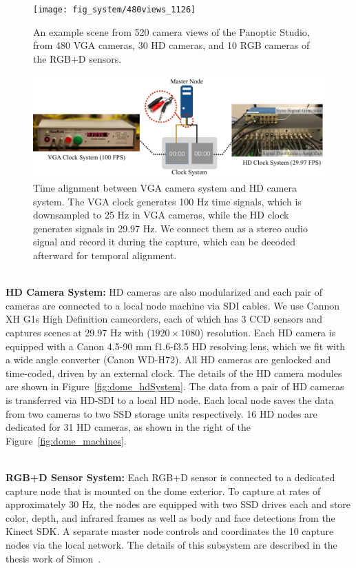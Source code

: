 \begin{figure}
	\centering       
	\texttt{[image: fig\_system/480views\_1126]}
	\caption{An example scene from 520 camera views of the Panoptic Studio, from 480 VGA cameras, 30 HD cameras, and 10 RGB cameras of the RGB+D sensors.}
	\label{fig:dome_exampleScene}
\end{figure}

\begin{figure}
	\centering       
	\includegraphics[trim=0 0 0 0,clip,width=\linewidth]{fig_system/dome_syncSystem}
	\caption{Time alignment between VGA camera system and HD camera system. The VGA clock generates 100 Hz time signals, which is downsampled to 25 Hz in VGA cameras, while the HD clock generates signals in 29.97 Hz. We connect them as a stereo audio signal and record it during the capture, which can be decoded afterward for temporal alignment.}
	\label{fig:dome_syncSystem}
\end{figure}
\mbox{ }\\
\noindent \textbf{HD Camera System:} HD cameras are also modularized and each pair of cameras are connected to a local node machine via SDI cables. We use Cannon XH G1s High Definition camcorders, each of which has 3 CCD sensors and captures scenes at 29.97 Hz with ($1920{\times}1080$) resolution. Each HD camera is equipped with a Canon 4.5-90 mm f1.6-f3.5 HD resolving lens, which we fit with a wide angle converter (Canon WD-H72). All HD cameras are genlocked and time-coded, driven by an external clock. The details of the HD camera modules are shown in Figure~\ref{fig:dome_hdSystem}. The data from a pair of HD cameras is transferred via HD-SDI to a local HD node. Each local node saves the data from two cameras to two SSD storage units respectively. 16 HD nodes are dedicated for 31 HD cameras, as shown in the right of the Figure~\ref{fig:dome_machines}.

\mbox{ }\\
\noindent \textbf{RGB+D Sensor System:} Each RGB+D sensor is connected to a dedicated capture node that is mounted on the dome exterior. To capture at rates of approximately 30 Hz, the nodes are equipped with two SSD drives each and store color, depth, and infrared frames as well as body and face detections from the Kinect SDK. A separate master node controls and coordinates the 10 capture nodes via the local network. The details of this subsystem are described in the thesis work of Simon~\cite{simon2017}.

